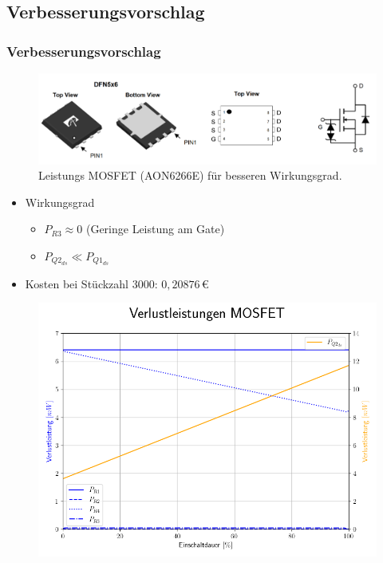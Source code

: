\documentclass{beamer}
\begin{document}
	\subsection{Verbesserungsvorschlag}
	\begin{frame}
		\frametitle{Verbesserungsvorschlag}
		\begin{center}
			\begin{figure}[tbh]
				\centering
				\includegraphics[width=1\linewidth]{medien/V3-4.png}
				\caption[MOSFET]{Leistungs MOSFET (AON6266E) für besseren Wirkungsgrad.}
			\end{figure}
		\end{center}
		\begin{itemize}
			\item{Wirkungsgrad}
			\begin{itemize}
				\item{$P_{R3} \approx 0$ (Geringe Leistung am Gate)}
				\item{$P_{Q2_{ds}} \ll P_{Q1_{ds}}$}
			\end{itemize}
			\item{Kosten bei Stückzahl 3000: $0,20876\,$\euro}
		\end{itemize}
	\end{frame}
	\begin{frame}
		\begin{center}
			\begin{figure}[tbh]
				\centering
				\includegraphics[width=0.95\linewidth]{medien/5.png}
			\end{figure}
		\end{center}
	\end{frame}
\end{document}
